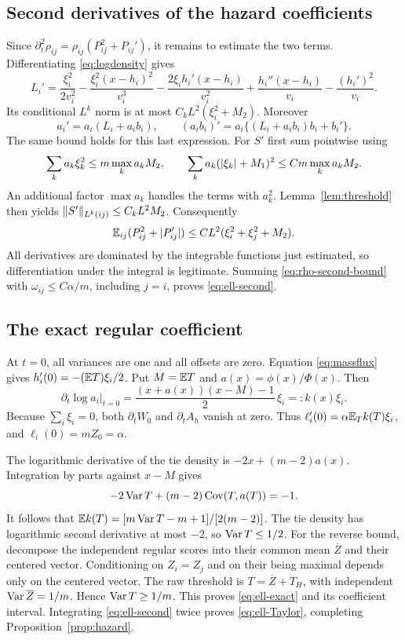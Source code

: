 \subsection{Second derivatives of the hazard coefficients}
Since $\partial_t^2\rho_{ij}=\rho_{ij}(P_{ij}^2+P_{ij}')$, it remains
to estimate the two terms. Differentiating \eqref{eq:logdensity} gives
\[
 L_i'=\frac{\xi_i^2}{2v_i^2}
 -\frac{\xi_i^2(x-h_i)^2}{v_i^3}
 -\frac{2\xi_i h_i'(x-h_i)}{v_i^2}
 +\frac{h_i''(x-h_i)}{v_i}-\frac{(h_i')^2}{v_i}.
\]
Its conditional $L^k$ norm is at most $C_kL^2(\xi_i^2+M_2)$.
Moreover
\[
 a_i'=a_i(L_i+a_ib_i),\qquad
 (a_ib_i)'=a_i\{(L_i+a_ib_i)b_i+b_i'\}.
\]
The same bound holds for this last expression. For $S'$ first sum
pointwise using
\[
 \sum_k a_k\xi_k^2\le m\max_k a_k M_2,\qquad
 \sum_k a_k(\lvert \xi_k\rvert+M_1)^2\le C m\max_k a_k M_2.
\]
An additional factor $\max a_k$ handles the terms with $a_k^2$.
Lemma~\ref{lem:threshold} then yields
$\lVert S'\rVert_{L^k(ij)}\le C_kL^2M_2$. Consequently
\begin{equation}\label{eq:rho-second-bound}
 \mathbb E_{ij}(P_{ij}^2+\lvert P_{ij}'\rvert)
                   \le CL^2(\xi_i^2+\xi_j^2+M_2).
\end{equation}
All derivatives are dominated by the integrable functions just estimated,
so differentiation under the integral is legitimate. Summing
\eqref{eq:rho-second-bound} with $\omega_{ij}\le C\alpha/m$, including
$j=i$, proves \eqref{eq:ell-second}.

\subsection{The exact regular coefficient}
At $t=0$, all variances are one and all offsets are zero. Equation
\eqref{eq:massflux} gives $h_i'(0)=-(\mathbb E T)\xi_i/2$.
Put $M=\mathbb E T$ and $a(x)=\phi(x)/\Phi(x)$. Then
\[
 \left.\partial_t\log a_i\right|_{t=0}
      =\frac{(x+a(x))(x-M)-1}{2}\,\xi_i=:k(x)\xi_i.
\]
Because $\sum_i\xi_i=0$, both $\partial_tW_0$ and
$\partial_tA_h$ vanish at zero. Thus
$\ell_i'(0)=\alpha\mathbb E_T k(T)\xi_i$, and
$\ell_i(0)=mZ_0=\alpha$.

The logarithmic derivative of the tie density is $-2x+(m-2)a(x)$.
Integration by parts against $x-M$ gives
\[
             -2\operatorname{Var} T+(m-2)\operatorname{Cov}(T,a(T))=-1.
\]
It follows that $\mathbb E k(T)=[m\operatorname{Var} T-m+1]/[2(m-2)]$.
The tie density has logarithmic second derivative at most $-2$, so
$\operatorname{Var} T\le1/2$. For the reverse bound, decompose the independent
regular scores into their common mean $\overline Z$ and their centered
vector. Conditioning on $Z_i=Z_j$ and on their being maximal depends
only on the centered vector. The raw threshold is
$T=\overline Z+T_H$, with independent $\operatorname{Var}\overline Z=1/m$.
Hence $\operatorname{Var} T\ge1/m$. This proves \eqref{eq:ell-exact} and its
coefficient interval. Integrating \eqref{eq:ell-second} twice proves
\eqref{eq:ell-Taylor}, completing Proposition~\ref{prop:hazard}.

